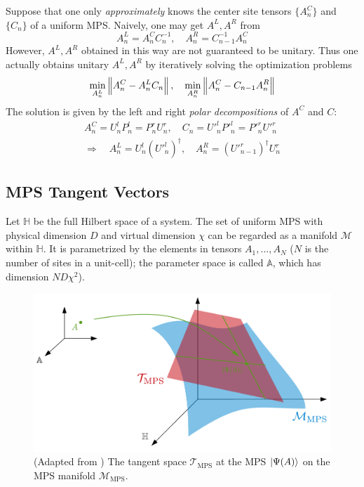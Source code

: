 \documentclass[11pt]{article}
\begin{document}
Suppose that one only \emph{approximately} knows the center site tensors $\{A^C_n\}$ and $\{C_n\}$ of a uniform MPS. Naively, one may get $A^L, A^R$ from
\begin{equation*}
    A^L_n = A^C_n C^{-1}_n, \quad
    A^R_n = C^{-1}_{n-1} A^C_n
\end{equation*}
However, $A^L, A^R$ obtained in this way are not guaranteed to be unitary. Thus one actually obtains unitary $A^L, A^R$ by iteratively solving the optimization problems
\begin{equation}
    \min_{A^L_n} \left\lVert A^C_n - A^L_n C_n \right\rVert, \quad
    \min_{A^R_n} \left\lVert A^C_n - C_{n-1} A^R_n \right\rVert
\end{equation}
The solution is given by the left and right \emph{polar decompositions} of $A^C$ and $C$: 
\begin{gather}
    A^C_n = U^l_n P^l_n = P^r_n U^r_n,
    \quad
    C_n = U'^l_n P'^l_n = P'^r_n U'^r_n
    \\[0.2em] \Rightarrow \quad
    A^L_n = U^l_n (U'^l_n)^\dagger, \quad
    A^R_n = (U'^r_{n-1})^\dagger U^r_n
\end{gather}


\subsection{MPS Tangent Vectors}

Let $\mathbb{H}$ be the full Hilbert space of a system. The set of uniform MPS with physical dimension $D$ and virtual dimension $\chi$ can be regarded as a manifold $\mathcal{M}$ within $\mathbb{H}$. It is parametrized by the elements in tensors $A_1, ..., A_N$ ($N$ is the number of sites in a unit-cell); the parameter space is called $\mathbb{A}$, which has dimension $N D \chi^2$). 

\begin{figure}[t]
    \centering
    \includegraphics[scale=0.4]{tangent.pdf}
    \caption[
        The tangent space $\mathcal{T}_\text{MPS}$ at the MPS $\ket{\Psi(A)}$ on the MPS manifold $\mathcal{M}_\text{MPS}$. 
    ]{
        (Adapted from \cite{Vanderstraeten2019})
        The tangent space $\mathcal{T}_\text{MPS}$ at the MPS $\ket{\Psi(A)}$ on the MPS manifold $\mathcal{M}_\text{MPS}$. 
    }
\end{figure}
\end{document}
